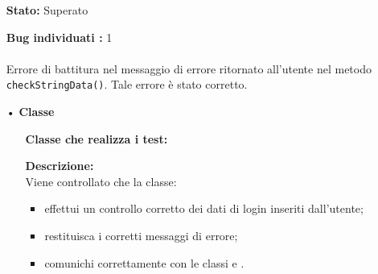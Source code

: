 {\begin{sloppypar}
{{\begin{itemize}
\begin{itemize}
\begin{itemize}
						\item \texttt{testLogoutUser()}: viene inizialmente creato un cookie\g~ per simulare una sessione attiva, successivamente viene richiamato il metodo \texttt{logoutUser()} e si controlla che invochi correttamente il metodo   \texttt{data)}, con la stringa uguale al contenuto del cookie\g~. Si verifica poi l'invocazione dei metodi  e .
						
						\item \texttt{testGetDataUser()}: viene verificata l'effettiva invocazione del metodo .
					\end{itemize}

					\item[] \textbf{Stato:} Superato
					\item[] \textbf{Bug individuati :} 1 \\
					\\ Errore di battitura nel messaggio di errore ritornato all’utente nel metodo \texttt{checkStringData()}. Tale errore è stato corretto.
				\end{itemize}
			\end{itemize}
\newpage
			\begin{itemize}
				\item[•]\textbf{Classe }
				\begin{itemize}
					\item[] \textbf{Classe che realizza i test:}\\ 

					\item[] \textbf{Descrizione:} \\Viene controllato che la classe:
					\begin{itemize}
						\item effettui un controllo corretto dei dati di login inseriti dall’utente;
						\item restituisca i corretti messaggi di errore;
						\item comunichi correttamente con le classi  e .
					\end{itemize}
					

\end{itemize}
\end{itemize}}}
\end{sloppypar}}
